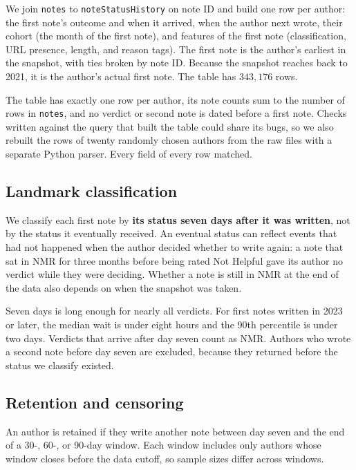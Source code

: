 \documentclass[sigconf,nonacm]{acmart}
\begin{document}
We join \texttt{notes} to \texttt{noteStatusHistory} on note ID and build one row per
author: the first note's outcome and when it arrived, when the author next wrote, their
cohort (the month of the first note), and features of the first note (classification, URL
presence, length, and reason tags). The first note is the author's earliest in the
snapshot, with ties broken by note ID. Because the snapshot reaches back to 2021, it is the
author's actual first note. The table has $343{,}176$ rows.

The table has exactly one row per author, its note counts sum to the number of rows in
\texttt{notes}, and no verdict or second note is dated before a first note. Checks written
against the query that built the table could share its bugs, so we also rebuilt the rows of
twenty randomly chosen authors from the raw files with a separate Python parser. Every field
of every row matched.

\subsection{Landmark classification}

We classify each first note by \textbf{its status seven days after it was written}, not by
the status it eventually received. An eventual status can reflect events that had not
happened when the author decided whether to write again: a note that sat in NMR for three
months before being rated Not Helpful gave its author no verdict while they were deciding.
Whether a note is still in NMR at the end of the data also depends on when the snapshot was
taken.

Seven days is long enough for nearly all verdicts. For first notes written in 2023 or later,
the median wait is under eight hours and the 90th percentile is under two days. Verdicts
that arrive after day seven count as NMR. Authors who wrote a second note before day seven
are excluded, because they returned before the status we classify existed.

\subsection{Retention and censoring}
\label{sec:retention}

An author is retained if they write another note between day seven and the end of a 30-,
60-, or 90-day window. Each window includes only authors whose window closes before the data
cutoff, so sample sizes differ across windows.
\end{document}
